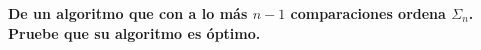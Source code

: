 \textbf{De un algoritmo que con a lo más $n - 1$ comparaciones ordena $\Sigma_n$. Pruebe que su algoritmo es óptimo.}\vspace{.2cm}

\textcolor{bibi}{}
\begin{quote}
\end{quote}